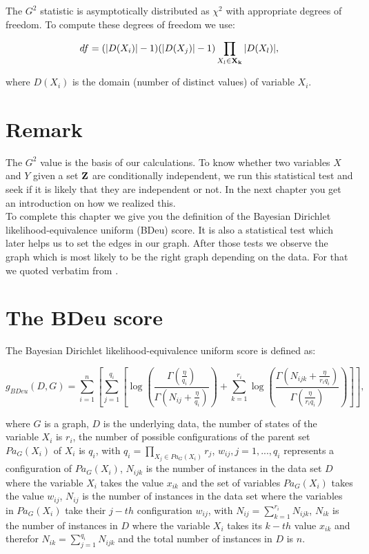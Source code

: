 		The $G^{2}$ statistic is asymptotically distributed as $\chi^{2}$ with appropriate degrees of freedom. To compute these degrees of freedom we use:

		\begin{equation}
			df = (|D(X_{i})| - 1)(|D(X_{j})| - 1) \prod_{X_{l} \in {\textbf{X}}_{{\textbf{k}}}} |D(X_{l})|,
		\end{equation}

		where $D(X_{i})$ is the domain (number of distinct values) of variable $X_{i}$.%

	\section*{Remark}

		The $G^{2}$ value is the basis of our calculations. To know whether two variables $X$ and $Y$ given a set ${\textbf{Z}}$ are conditionally independent, we run this statistical test and seek if it is likely that they are independent or not. In the next chapter you get an introduction on how we realized this. \\
		To complete this chapter we give you the definition of the Bayesian Dirichlet likelihood-equivalence uniform (BDeu) score. It is also a statistical test which later helps us to set the edges in our graph. After those tests we observe the graph which is most likely to be the right graph depending on the data. For that we quoted verbatim from \cite{Ca06}.

	\section*{The BDeu score} \label{s.BDeu}

		The Bayesian Dirichlet likelihood-equivalence uniform score is defined as:

		\begin{equation}
			g_{BDeu}(D, G) = \sum_{i = 1}^{n} \left[ \sum_{j = 1}^{q_{i}} \left[ \log\left( \frac{\Gamma (\frac{\eta}{q_{i}})}{\Gamma (N_{ij} + \frac{\eta}{q_{i}})} \right) + \sum_{k = 1}^{r_{i}} \log \left( \frac{\Gamma (N_{ijk} + \frac{\eta}{r_{i} q_{i}})}{\Gamma (\frac{\eta}{r_{i} q_{i}})} \right) \right] \right],
		\end{equation}

		where $G$ is a graph, $D$ is the underlying data, the number of states of the variable $X_{i}$ is $r_{i}$, the number of possible configurations of the parent set $Pa_{G}(X_{i})$ of $X_{i}$ is $q_{i}$, with $q_{i} = \prod_{X_{j} \in Pa_{G}(X_{i})} r_{j}$, $w_{ij}, j = 1,...,q_{i}$ represents a configuration of $Pa_{G}(X_{i})$, $N_{ijk}$ is the number of instances in the data set $D$ where the variable $X_{i}$ takes the value $x_{ik}$ and the set of variables $Pa_{G}(X_{i})$ takes the value $w_{ij}$, $N_{ij}$ is the number of instances in the data set where the variables in $Pa_{G}(X_{i})$ take their $j-th$ configuration $w_{ij}$, with $N_{ij} = \sum_{k = 1}^{r_{i}} N_{ijk}$, $N_{ik}$ is the number of instances in $D$ where the variable $X_{i}$ takes its $k-th$ value $x_{ik}$ and therefor $N_{ik} = \sum_{j = 1}^{q_{i}} N_{ijk}$ and the total number of instances in $D$ is $n$.

